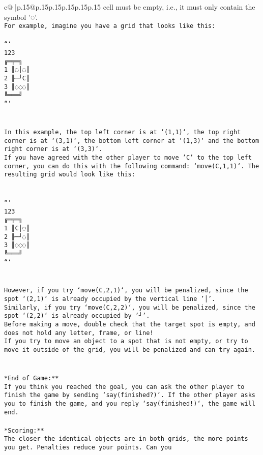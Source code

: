 \documentclass{article}
\begin{document}
{\begin{supertabular}{c@{$\;$}|p{.15\linewidth}@{}p{.15\linewidth}p{.15\linewidth}p{.15\linewidth}p{.15\linewidth}p{.15\linewidth}}
{{{cell must be empty, i.e., it must only contain the symbol '◌'.\\ \tt * For example, imagine you have a grid that looks like this: \\ \tt \\ \tt ```\\ \tt     123\\ \tt    ╔═╤═╗\\ \tt  1 ║◌│◌║\\ \tt  2 ╟─┘C║\\ \tt  3 ║◌◌◌║\\ \tt    ╚═══╝\\ \tt ```\\ \tt \\ \tt \\ \tt * In this example, the top left corner is at `(1,1)`, the top right corner is at `(3,1)`, the bottom left corner at `(1,3)` and the bottom right corner is at `(3,3)`.\\ \tt * If you have agreed with the other player to move 'C' to the top left corner, you can do this with the following command: `move(C,1,1)`. The resulting grid would look like this: \\ \tt \\ \tt \\ \tt ```\\ \tt     123\\ \tt    ╔═╤═╗\\ \tt  1 ║C│◌║\\ \tt  2 ╟─┘◌║\\ \tt  3 ║◌◌◌║\\ \tt    ╚═══╝\\ \tt ```\\ \tt \\ \tt \\ \tt * However, if you try `move(C,2,1)`, you will be penalized, since the spot `(2,1)` is already occupied by the vertical line '│'.\\ \tt * Similarly, if you try `move(C,2,2)`, you will be penalized, since the spot `(2,2)` is already occupied by '┘'.\\ \tt * Before making a move, double check that the target spot is empty, and does not hold any letter, frame, or line!\\ \tt * If you try to move an object to a spot that is not empty, or try to move it outside of the grid, you will be penalized and can try again.\\ \tt \\ \tt \\ \tt **End of Game:**\\ \tt If you think you reached the goal, you can ask the other player to finish the game by sending `say(finished?)`. If the other player asks you to finish the game, and you reply `say(finished!)`, the game will end.\\ \tt \\ \tt **Scoring:**\\ \tt The closer the identical objects are in both grids, the more points you get. Penalties reduce your points. Can you }}}
\end{supertabular}}
\end{document}
